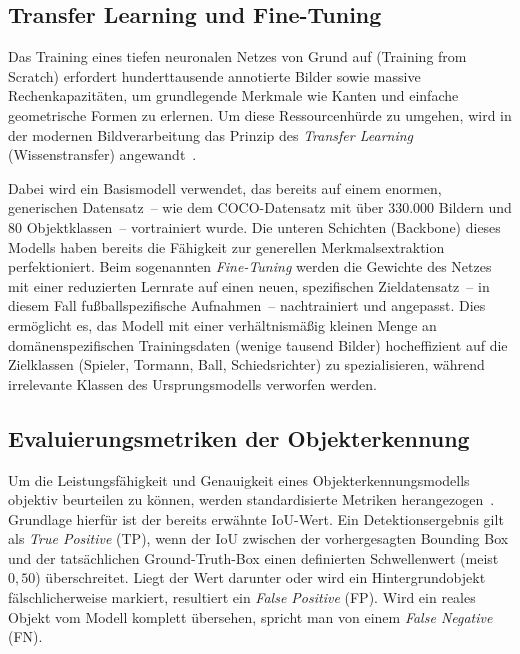 \subsection{Transfer Learning und Fine-Tuning}

Das Training eines tiefen neuronalen Netzes von Grund auf (Training from Scratch) erfordert 
hunderttausende annotierte Bilder sowie massive Rechenkapazitäten, um grundlegende Merkmale wie Kanten 
und einfache geometrische Formen zu erlernen. Um diese Ressourcenhürde zu umgehen, wird in der modernen 
Bildverarbeitung das Prinzip des \textit{Transfer Learning} (Wissenstransfer) angewandt~\cite{pan2009survey}.

Dabei wird ein Basismodell verwendet, das bereits auf einem enormen, generischen Datensatz~-- wie 
dem \ac{COCO}-Datensatz mit über 330.000 Bildern und 80 Objektklassen~-- vortrainiert wurde. Die 
unteren Schichten (Backbone) dieses Modells haben bereits die Fähigkeit zur generellen Merkmalsextraktion 
perfektioniert. Beim sogenannten \textit{Fine-Tuning} werden die Gewichte des Netzes mit einer reduzierten 
Lernrate auf einen neuen, spezifischen Zieldatensatz~-- in diesem Fall fußballspezifische Aufnahmen~-- 
nachtrainiert und angepasst. Dies ermöglicht es, das Modell mit einer verhältnismäßig kleinen Menge an 
domänenspezifischen Trainingsdaten (wenige tausend Bilder) hocheffizient auf die Zielklassen 
(Spieler, Tormann, Ball, Schiedsrichter) zu spezialisieren, während irrelevante Klassen des 
Ursprungsmodells verworfen werden.

\subsection{Evaluierungsmetriken der Objekterkennung}

Um die Leistungsfähigkeit und Genauigkeit eines Objekterkennungsmodells objektiv beurteilen zu können, 
werden standardisierte Metriken herangezogen~\cite{padilla2020survey}. Grundlage hierfür ist der 
bereits erwähnte \ac{IoU}-Wert. Ein Detektionsergebnis gilt als \textit{True Positive} (TP), wenn der 
\ac{IoU} zwischen der vorhergesagten Bounding Box und der tatsächlichen Ground-Truth-Box einen 
definierten Schwellenwert (meist $0{,}50$) überschreitet. Liegt der Wert darunter oder wird ein 
Hintergrundobjekt fälschlicherweise markiert, resultiert ein \textit{False Positive} (FP). Wird ein 
reales Objekt vom Modell komplett übersehen, spricht man von einem \textit{False Negative} (FN).

